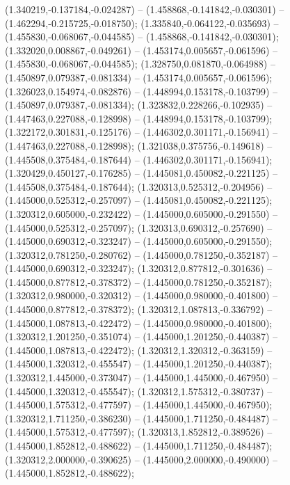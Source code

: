  (1.340219,-0.137184,-0.024287) -- (1.458868,-0.141842,-0.030301) -- (1.462294,-0.215725,-0.018750);
 (1.335840,-0.064122,-0.035693) -- (1.455830,-0.068067,-0.044585) -- (1.458868,-0.141842,-0.030301);
 (1.332020,0.008867,-0.049261) -- (1.453174,0.005657,-0.061596) -- (1.455830,-0.068067,-0.044585);
 (1.328750,0.081870,-0.064988) -- (1.450897,0.079387,-0.081334) -- (1.453174,0.005657,-0.061596);
 (1.326023,0.154974,-0.082876) -- (1.448994,0.153178,-0.103799) -- (1.450897,0.079387,-0.081334);
 (1.323832,0.228266,-0.102935) -- (1.447463,0.227088,-0.128998) -- (1.448994,0.153178,-0.103799);
 (1.322172,0.301831,-0.125176) -- (1.446302,0.301171,-0.156941) -- (1.447463,0.227088,-0.128998);
 (1.321038,0.375756,-0.149618) -- (1.445508,0.375484,-0.187644) -- (1.446302,0.301171,-0.156941);
 (1.320429,0.450127,-0.176285) -- (1.445081,0.450082,-0.221125) -- (1.445508,0.375484,-0.187644);
 (1.320313,0.525312,-0.204956) -- (1.445000,0.525312,-0.257097) -- (1.445081,0.450082,-0.221125);
 (1.320312,0.605000,-0.232422) -- (1.445000,0.605000,-0.291550) -- (1.445000,0.525312,-0.257097);
 (1.320313,0.690312,-0.257690) -- (1.445000,0.690312,-0.323247) -- (1.445000,0.605000,-0.291550);
 (1.320312,0.781250,-0.280762) -- (1.445000,0.781250,-0.352187) -- (1.445000,0.690312,-0.323247);
 (1.320312,0.877812,-0.301636) -- (1.445000,0.877812,-0.378372) -- (1.445000,0.781250,-0.352187);
 (1.320312,0.980000,-0.320312) -- (1.445000,0.980000,-0.401800) -- (1.445000,0.877812,-0.378372);
 (1.320312,1.087813,-0.336792) -- (1.445000,1.087813,-0.422472) -- (1.445000,0.980000,-0.401800);
 (1.320312,1.201250,-0.351074) -- (1.445000,1.201250,-0.440387) -- (1.445000,1.087813,-0.422472);
 (1.320312,1.320312,-0.363159) -- (1.445000,1.320312,-0.455547) -- (1.445000,1.201250,-0.440387);
 (1.320312,1.445000,-0.373047) -- (1.445000,1.445000,-0.467950) -- (1.445000,1.320312,-0.455547);
 (1.320312,1.575312,-0.380737) -- (1.445000,1.575312,-0.477597) -- (1.445000,1.445000,-0.467950);
 (1.320312,1.711250,-0.386230) -- (1.445000,1.711250,-0.484487) -- (1.445000,1.575312,-0.477597);
 (1.320313,1.852812,-0.389526) -- (1.445000,1.852812,-0.488622) -- (1.445000,1.711250,-0.484487);
 (1.320312,2.000000,-0.390625) -- (1.445000,2.000000,-0.490000) -- (1.445000,1.852812,-0.488622);
